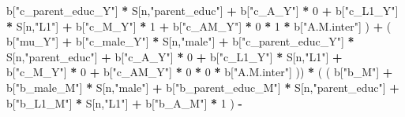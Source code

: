 \documentclass[
]{book}
\newenvironment{Shaded}{\begin{snugshade}}{\end{snugshade}}
\newcommand{\DecValTok}[1]{\textcolor[rgb]{0.00,0.00,0.81}{#1}}
\newcommand{\NormalTok}[1]{#1}
\newcommand{\SpecialCharTok}[1]{\textcolor[rgb]{0.81,0.36,0.00}{\textbf{#1}}}
\newcommand{\StringTok}[1]{\textcolor[rgb]{0.31,0.60,0.02}{#1}}
\begin{document}
\begin{Shaded}
\begin{Highlighting}[]
\NormalTok{                                 b[}\StringTok{"c\_parent\_educ\_Y"}\NormalTok{] }\SpecialCharTok{*}\NormalTok{ S[n,}\StringTok{"parent\_educ"}\NormalTok{] }\SpecialCharTok{+} 
\NormalTok{                                 b[}\StringTok{"c\_A\_Y"}\NormalTok{] }\SpecialCharTok{*} \DecValTok{0} \SpecialCharTok{+} 
\NormalTok{                                 b[}\StringTok{"c\_L1\_Y"}\NormalTok{] }\SpecialCharTok{*}\NormalTok{ S[n,}\StringTok{"L1"}\NormalTok{] }\SpecialCharTok{+}
\NormalTok{                                 b[}\StringTok{"c\_M\_Y"}\NormalTok{] }\SpecialCharTok{*} \DecValTok{1} \SpecialCharTok{+}
\NormalTok{                                 b[}\StringTok{"c\_AM\_Y"}\NormalTok{] }\SpecialCharTok{*} \DecValTok{0} \SpecialCharTok{*} \DecValTok{1} \SpecialCharTok{*}\NormalTok{ b[}\StringTok{"A.M.inter"}\NormalTok{] ) }\SpecialCharTok{+} 
\NormalTok{                             ( b[}\StringTok{"mu\_Y"}\NormalTok{] }\SpecialCharTok{+} 
\NormalTok{                                 b[}\StringTok{"c\_male\_Y"}\NormalTok{] }\SpecialCharTok{*}\NormalTok{ S[n,}\StringTok{"male"}\NormalTok{] }\SpecialCharTok{+} 
\NormalTok{                                 b[}\StringTok{"c\_parent\_educ\_Y"}\NormalTok{] }\SpecialCharTok{*}\NormalTok{ S[n,}\StringTok{"parent\_educ"}\NormalTok{] }\SpecialCharTok{+} 
\NormalTok{                                 b[}\StringTok{"c\_A\_Y"}\NormalTok{] }\SpecialCharTok{*} \DecValTok{0} \SpecialCharTok{+} 
\NormalTok{                                 b[}\StringTok{"c\_L1\_Y"}\NormalTok{] }\SpecialCharTok{*}\NormalTok{ S[n,}\StringTok{"L1"}\NormalTok{] }\SpecialCharTok{+}
\NormalTok{                                 b[}\StringTok{"c\_M\_Y"}\NormalTok{] }\SpecialCharTok{*} \DecValTok{0} \SpecialCharTok{+}
\NormalTok{                                 b[}\StringTok{"c\_AM\_Y"}\NormalTok{] }\SpecialCharTok{*} \DecValTok{0} \SpecialCharTok{*} \DecValTok{0} \SpecialCharTok{*}\NormalTok{ b[}\StringTok{"A.M.inter"}\NormalTok{] )) }\SpecialCharTok{*}
\NormalTok{      ( ( b[}\StringTok{"b\_M"}\NormalTok{] }\SpecialCharTok{+} 
\NormalTok{            b[}\StringTok{"b\_male\_M"}\NormalTok{] }\SpecialCharTok{*}\NormalTok{ S[n,}\StringTok{"male"}\NormalTok{] }\SpecialCharTok{+} 
\NormalTok{            b[}\StringTok{"b\_parent\_educ\_M"}\NormalTok{] }\SpecialCharTok{*}\NormalTok{ S[n,}\StringTok{"parent\_educ"}\NormalTok{] }\SpecialCharTok{+} 
\NormalTok{            b[}\StringTok{"b\_L1\_M"}\NormalTok{] }\SpecialCharTok{*}\NormalTok{ S[n,}\StringTok{"L1"}\NormalTok{] }\SpecialCharTok{+}
\NormalTok{            b[}\StringTok{"b\_A\_M"}\NormalTok{] }\SpecialCharTok{*} \DecValTok{1}\NormalTok{ ) }\SpecialCharTok{{-}} 

\end{Highlighting}
\end{Shaded}
\end{document}
